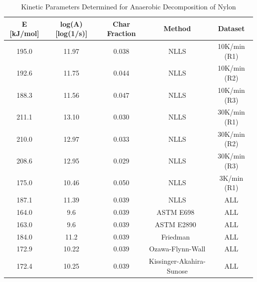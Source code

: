 \documentclass[12pt,oneside]{book}
\begin{document}
\begin{table}[!ht]{}
\centering
\caption[Kinetic Parameters Determined for Anaerobic Decomposition of Nylon]{Kinetic Parameters Determined for Anaerobic Decomposition of Nylon}
{\begin{tabular}{ccccc}
\toprule
E [kJ/mol] 		& log(A) [log(1/s)]  	& Char Fraction 	&  Method  & Dataset \\
\midrule
195.0 & 11.97 	& 	0.038	& NLLS  		& 10K/min (R1)  \\ 
192.6 & 11.75 	&	0.044	& NLLS  		& 10K/min (R2)  \\ 
188.3 & 11.56 	&	0.047	& NLLS 	 		& 10K/min (R3)  \\ 
211.1 & 13.10 	&	0.030	& NLLS  		& 30K/min (R1)  \\ 
210.0 & 12.97 	&	0.033	& NLLS  		& 30K/min (R2)  \\ 
208.6 & 12.95 	&	0.029	& NLLS  		& 30K/min (R3)  \\ 
175.0 & 10.46 	&	0.050	& NLLS  		& 3K/min (R1) \\ 
187.1 & 11.39 	&	0.039	& NLLS  		& ALL \\ 
164.0 & 9.6   	&	0.039	& ASTM E698~\cite{ASTM_E698} 		& ALL \\ 
163.0 & 9.6 	&	0.039	& ASTM E2890~\cite{ASTM_E2890}  		& ALL \\ 
184.0 & 11.2 	&	0.039	& Friedman~\cite{Friedman}  		& ALL \\ 
172.9 & 10.22 	&	0.039	& Ozawa-Flynn-Wall 					& ALL \\ 
172.4 & 10.25 	&	0.039	& Kissinger-Akahira-Sunose	 		& ALL \\ 
\bottomrule
\end{tabular}}
\label{tab:nylon_kinetics}
\end{table}
\end{document}
